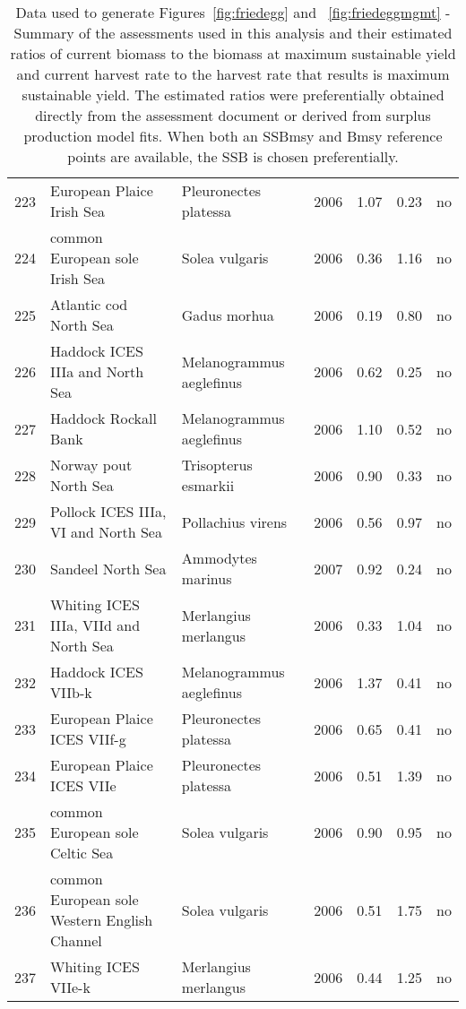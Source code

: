 \begin{table}[ht]
\begin{center}
\begin{tabular}{rllrrrl}
  223 & European Plaice Irish Sea & Pleuronectes platessa & 2006 & 1.07 & 0.23 & no \\
  224 & common European sole Irish Sea & Solea vulgaris & 2006 & 0.36 & 1.16 & no \\
  225 & Atlantic cod North Sea & Gadus morhua & 2006 & 0.19 & 0.80 & no \\
  226 & Haddock ICES IIIa and North Sea & Melanogrammus aeglefinus & 2006 & 0.62 & 0.25 & no \\
  227 & Haddock Rockall Bank & Melanogrammus aeglefinus & 2006 & 1.10 & 0.52 & no \\
  228 & Norway pout North Sea & Trisopterus esmarkii & 2006 & 0.90 & 0.33 & no \\
  229 & Pollock ICES IIIa, VI and North Sea & Pollachius virens & 2006 & 0.56 & 0.97 & no \\
  230 & Sandeel North Sea & Ammodytes marinus & 2007 & 0.92 & 0.24 & no \\
  231 & Whiting ICES IIIa, VIId and North Sea & Merlangius merlangus & 2006 & 0.33 & 1.04 & no \\
  232 & Haddock ICES VIIb-k & Melanogrammus aeglefinus & 2006 & 1.37 & 0.41 & no \\
  233 & European Plaice ICES VIIf-g & Pleuronectes platessa & 2006 & 0.65 & 0.41 & no \\
  234 & European Plaice ICES VIIe & Pleuronectes platessa & 2006 & 0.51 & 1.39 & no \\
  235 & common European sole Celtic Sea & Solea vulgaris & 2006 & 0.90 & 0.95 & no \\
  236 & common European sole Western English Channel & Solea vulgaris & 2006 & 0.51 & 1.75 & no \\
  237 & Whiting ICES VIIe-k & Merlangius merlangus & 2006 & 0.44 & 1.25 & no \\
   \hline
\end{tabular}
\caption{Data used to generate Figures~\ref{fig:friedegg} and ~\ref{fig:friedeggmgmt} - Summary of the assessments used in this analysis and their estimated ratios of current biomass to the biomass at maximum sustainable yield and current harvest rate to the harvest rate that results is maximum sustainable yield. The estimated ratios were preferentially obtained directly from the assessment document or derived from surplus production model fits. When both an SSBmsy and Bmsy reference points are available, the SSB is chosen preferentially.}
\label{tab:crosshair}
\end{center}
\end{table}
